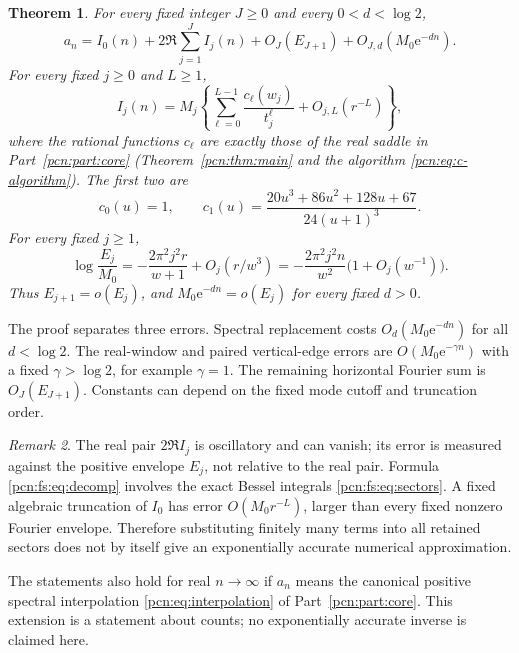 \documentclass[11pt,letterpaper]{article}
\newtheorem{theorem}{Theorem}[section]
\theoremstyle{remark}\newtheorem{remark}[theorem]{Remark}
\newcommand{\ee}{\mathrm e}
\begin{document}
\begin{theorem}\label{pcn:fs:thm:main}
For every fixed integer $J\ge0$ and every $0<d<\log2$,
\begin{equation}\label{pcn:fs:eq:decomp}
 a_n=I_0(n)+2\Re\sum_{j=1}^J I_j(n)
       +O_J(E_{J+1})+O_{J,d}(M_0\ee^{-dn}).
\end{equation}
For every fixed $j\ge0$ and $L\ge1$,
\begin{equation}\label{pcn:fs:eq:sector-expansion}
 I_j(n)=M_j\left\{\sum_{\ell=0}^{L-1}
                 \frac{c_\ell(w_j)}{t_j^\ell}
                    +O_{j,L}(r^{-L})\right\},
\end{equation}
where the rational functions $c_\ell$ are exactly those of the real saddle in Part~\ref{pcn:part:core} (Theorem~\ref{pcn:thm:main} and the algorithm \eqref{pcn:eq:c-algorithm}). The first two are
\[
 c_0(u)=1,\qquad
 c_1(u)=\frac{20u^3+86u^2+128u+67}{24(u+1)^3}.
\]
For every fixed $j\ge1$,
\begin{equation}\label{pcn:fs:eq:envelope}
 \log\frac{E_j}{M_0}
 =-\frac{2\pi^2j^2r}{w+1}+O_j(r/w^3)
 =-\frac{2\pi^2j^2n}{w^2}\bigl(1+O_j(w^{-1})\bigr).
\end{equation}
Thus $E_{j+1}=o(E_j)$, and $M_0\ee^{-dn}=o(E_j)$ for every fixed $d>0$.
\end{theorem}

The proof separates three errors. Spectral replacement costs $O_d(M_0\ee^{-dn})$ for all $d<\log2$. The real-window and paired vertical-edge errors are $O(M_0\ee^{-\gamma n})$ with a fixed $\gamma>\log2$, for example $\gamma=1$. The remaining horizontal Fourier sum is $O_J(E_{J+1})$. Constants can depend on the fixed mode cutoff and truncation order.

\begin{remark}\label{pcn:fs:rem:scope}
The real pair $2\Re I_j$ is oscillatory and can vanish; its error is measured against the positive envelope $E_j$, not relative to the real pair. Formula \eqref{pcn:fs:eq:decomp} involves the exact Bessel integrals \eqref{pcn:fs:eq:sectors}. A fixed algebraic truncation of $I_0$ has error $O(M_0r^{-L})$, larger than every fixed nonzero Fourier envelope. Therefore substituting finitely many terms into all retained sectors does not by itself give an exponentially accurate numerical approximation.
\end{remark}

The statements also hold for real $n\to\infty$ if $a_n$ means the canonical positive spectral interpolation \eqref{pcn:eq:interpolation} of Part~\ref{pcn:part:core}. This extension is a statement about counts; no exponentially accurate inverse is claimed here.
\end{document}
